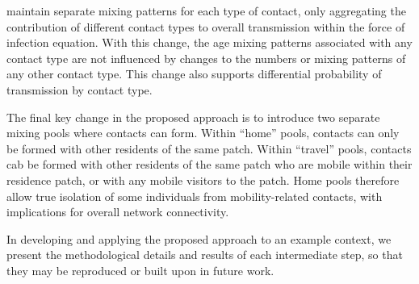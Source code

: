 maintain separate mixing patterns for each type of contact,
only aggregating the contribution of different contact types to overall transmission
within the force of infection equation.
With this change, the age mixing patterns associated with any contact type
are not influenced by changes to the numbers or mixing patterns of any other contact type.
This change also supports differential probability of transmission by contact type.
\par
The final key change in the proposed approach is to
introduce two separate mixing pools where contacts can form.
Within ``home'' pools, contacts can only be formed with other residents of the same patch.
Within ``travel'' pools, contacts cab be formed with other residents of the same patch
who are mobile within their residence patch, or with any mobile visitors to the patch.
Home pools therefore allow true isolation of some individuals from mobility-related contacts,
with implications for overall network connectivity.
\par
In developing and applying the proposed approach to an example context,
we present the methodological details and results of each intermediate step,
so that they may be reproduced or built upon in future work.
